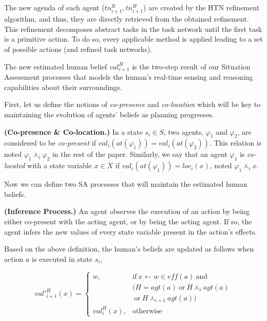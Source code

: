 The new agenda of each agent ($tn^R_{i+1}, tn^H_{i+1}$) are created by the HTN refinement algorithm, and thus, they are directly retrieved from the obtained refinement. 
This refinement decomposes abstract tasks in the task network until the first task is a primitive action. To do so, every applicable method is applied leading to a set of possible actions (and refined task networks).

The new estimated human belief $val^H_{i+1}$ is the two-step result of our Situation Assessment processes that models the human's real-time sensing and reasoning capabilities about their surroundings.

First, let us define the notions of \textit{co-presence} and \textit{co-location} which will be key to maintaining the evolution of agents' beliefs as planning progresses.

\begin{definition} \label{def:co-pre-loc}
    \textbf{(Co-presence \& Co-location.)} In a state $s_i \in S$, two agents, $\varphi_1$ and $\varphi_2$, are considered to be \textit{co-present} if $val_i(at(\varphi_1)) = val_i(at(\varphi_2))$. This relation is noted $\varphi_1 \curlywedge_i \varphi_2$ in the rest of the paper. Similarly, we say that an agent $\varphi_1$ is \textit{co-located} with a state variable $x \in X$ if $val_i(at(\varphi_1)) = loc_i(x)$, noted $\varphi_1 \curlywedge_i x$.
\end{definition}

Now we can define two SA processes that will maintain the estimated human beliefs.

\begin{definition} \label{def:new_inf}
    \textbf{(Inference Process.)} An agent observes the execution of an action by being either co-present with the acting agent, 
    or by being the acting agent. If so, the agent infers the new values of every state variable present in the action's effects.
\end{definition}

Based on the above definition, the human's beliefs are updated as follows when action $a$ is executed in state $s_i$, 

\begin{equation}
val'^H_{i+1}(x) = \left\{ 
\begin{array}{ll}
    w, & \mbox{if} ~ x \leftarrow w \in \textit{eff}(a) ~ \mbox{and}  \\ 
    & (H = \textit{agt}(a) ~\mbox{or}~ H \curlywedge_i \textit{agt}(a)\\
    & ~\mbox{or}~ H \curlywedge_{i+1} \textit{agt}(a))\\
    val^H_i(x), & \mbox{otherwise}
\end{array}\right.
\end{equation}

